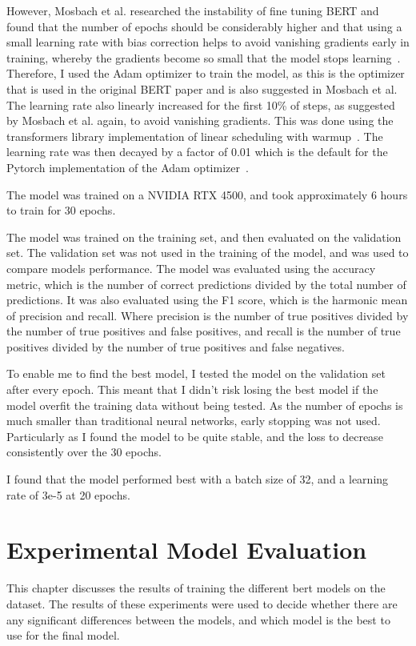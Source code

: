 \documentclass{UoYCSproject}
\begin{document}
    However, Mosbach et al. researched the instability of fine tuning BERT and found that the number of epochs should be considerably higher and that using a small learning rate with bias correction helps to avoid vanishing gradients early in training, whereby the gradients become so small that the model stops learning~\cite{mosbach2021stability}.
    Therefore, I used the Adam optimizer to train the model, as this is the optimizer that is used in the original BERT paper and is also suggested in Mosbach et al.
    The learning rate also linearly increased for the first 10\% of steps, as suggested by Mosbach et al. again, to avoid vanishing gradients.
    This was done using the transformers library implementation of linear scheduling with warmup~\cite{transformerLinearSchedular}.
    The learning rate was then decayed by a factor of 0.01 which is the default for the Pytorch implementation of the Adam optimizer~\cite{adamPytorch}.

    The model was trained on a NVIDIA RTX 4500, and took approximately 6 hours to train for 30 epochs. \par

    The model was trained on the training set, and then evaluated on the validation set.
    The validation set was not used in the training of the model, and was used to compare models performance.
    The model was evaluated using the accuracy metric, which is the number of correct predictions divided by the total number of predictions.
    It was also evaluated using the F1 score, which is the harmonic mean of precision and recall.
    Where precision is the number of true positives divided by the number of true positives and false positives, and recall is the number of true positives divided by the number of true positives and false negatives.

    To enable me to find the best model, I tested the model on the validation set after every epoch.
    This meant that I didn't risk losing the best model if the model overfit the training data without being tested.
    As the number of epochs is much smaller than traditional neural networks, early stopping was not used.
    Particularly as I found the model to be quite stable, and the loss to decrease consistently over the 30 epochs.

    I found that the model performed best with a batch size of 32, and a learning rate of 3e-5 at 20 epochs.

    \chapter{Experimental Model Evaluation}
    \label{ch:experimental-model-evaluation}
    This chapter discusses the results of training the different bert models on the dataset.
    The results of these experiments were used to decide whether there are any significant differences between the models, and which model is the best to use for the final model.
\end{document}
